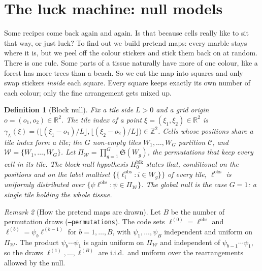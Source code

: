 \documentclass[11pt,a4paper]{article}
\newtheorem{definition}{Definition}[section]
\theoremstyle{remark}
\newtheorem{remark}[definition]{Remark}
\newcommand{\cells}{\mathcal{C}}
\newcommand{\lab}{\ell}
\newcommand{\obs}{\mathrm{obs}}
\newcommand{\Real}{\mathbb{R}}
\newcommand{\Int}{\mathbb{Z}}
\newcommand{\Sym}{\mathfrak{S}}
\newcommand{\tiles}{\mathcal{W}}
\newcommand{\mset}[1]{\{\!\{#1\}\!\}}
\begin{document}
\section{The luck machine: null models}
\label{sec:null}

\begin{plain}
Some recipes come back again and again. Is that because cells really like to
sit that way, or just luck? To find out we build pretend maps: every marble
stays where it is, but we peel off the colour stickers and stick them back on
at random. There is one rule. Some parts of a tissue naturally have more of
one colour, like a forest has more trees than a beach. So we cut the map into
squares and only swap stickers \emph{inside} each square. Every square keeps
exactly its own number of each colour; only the fine arrangement gets mixed
up.
\end{plain}

\begin{definition}[Block null]
\label{def:block}
Fix a tile side $L>0$ and a grid origin $o=(o_1,o_2)\in\Real^2$. The tile
index of a point $\xi=(\xi_1,\xi_2)\in\Real^2$ is
$\gamma_L(\xi)=\bigl(\lfloor (\xi_1-o_1)/L\rfloor,\lfloor (\xi_2-o_2)/L\rfloor\bigr)\in\Int^2$.
Cells whose positions share a tile index form a \emph{tile}; the $G$ non-empty
tiles $W_1,\dots,W_G$ partition $\cells$, and $\tiles=\{W_1,\dots,W_G\}$. Let
$\Pi_{\tiles}=\prod_{g=1}^G\Sym(W_g)$, the permutations that keep every cell
in its tile. The \emph{block null hypothesis} $H_0^{\mathrm{blk}}$ states
that, conditional on the positions and on the label multiset
$\mset{\lab^{\obs}_i:i\in W_g}$ of every tile, $\lab^{\obs}$ is uniformly
distributed over $\{\psi\lab^{\obs}:\psi\in\Pi_{\tiles}\}$. The global null is
the case $G=1$: a single tile holding the whole tissue.
\end{definition}

\begin{remark}[How the pretend maps are drawn]
\label{rem:draws}
Let $B$ be the number of permutation draws (\texttt{--permutations}). The
code sets $\lab^{(0)}=\lab^{\obs}$ and $\lab^{(b)}=\psi_b\lab^{(b-1)}$ for
$b=1,\dots,B$, with $\psi_1,\dots,\psi_B$ independent and uniform on
$\Pi_{\tiles}$. The product $\psi_b\cdots\psi_1$ is again uniform on
$\Pi_{\tiles}$ and independent of $\psi_{b-1}\cdots\psi_1$, so the draws
$\lab^{(1)},\dots,\lab^{(B)}$ are i.i.d.\ and uniform over the rearrangements
allowed by the null.
\end{remark}
\end{document}
